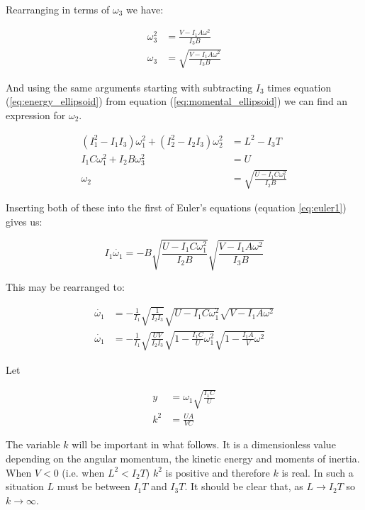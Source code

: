 \documentclass[a4paper, 12pt]{article}
\begin{document}
Rearranging in terms of $\omega_3$ we have:

\begin{align}
  \omega_3^2 &=\frac{V-I_1A\omega^2}{I_3B} \\
  \omega_3 &=\sqrt{\frac{V-I_1A\omega^2}{I_3B}}
\end{align}

And using the same arguments starting with subtracting $I_3$ times equation (\ref{eq:energy_ellipsoid}) from equation (\ref{eq:momental_ellipsoid}) we can find an expression for $\omega_2$.

\begin{align}
  (I_1^2 - I_1I_3)\omega_1^2 + (I_2^2-I_2I_3)\omega_2^2 &= L^2 - I_3T \\
  I_1C\omega_1^2 + I_2B\omega_3^2 &= U \\
  \omega_2 &=\sqrt{\frac{U - I_1C\omega_1^2}{I_2B}}
\end{align}

Inserting both of these into the first of Euler's equations (equation \ref{eq:euler1}) gives us:

\begin{equation}
  I_1\dot{\omega_1} = -B\sqrt{\frac{U-I_1C\omega_1^2}{I_2B}}\sqrt{\frac{V-I_1A\omega^2}{I_3B}}
\end{equation}

This may be rearranged to:

  \begin{align}
    \dot{\omega_1} &= -\frac{1}{I_1}\sqrt{\frac{1}{I_2I_3}}\sqrt{U-I_1C\omega_1^2}\sqrt{V-I_1A\omega^2} \\
    \dot{\omega_1} &= -\frac{1}{I_1}\sqrt{\frac{UV}{I_2I_3}}\sqrt{1 - \frac{I_1C}{U}\omega_1^2}\sqrt{1-\frac{I_1A}{V}\omega^2}\label{eq:fullnode}
  \end{align}

Let

\begin{align}
  y &= \omega_1\sqrt{\frac{I_1C}{U}} \label{eq:defy}\\
  k^2 & = \frac{UA}{VC}\label{eq:defk}
\end{align}

The variable $k$ will be important in what follows. It is a dimensionless value depending on the angular momentum, the kinetic energy and moments of inertia. When $V < 0$ (i.e. when $L^2 < I_2T$) $k^2$ is positive and therefore $k$ is real. In such a situation $L$ must be between $I_1T$ and $I_3T$.  It should be clear that, as $L\to I_2T$ so $k\to\infty$.
\end{document}
